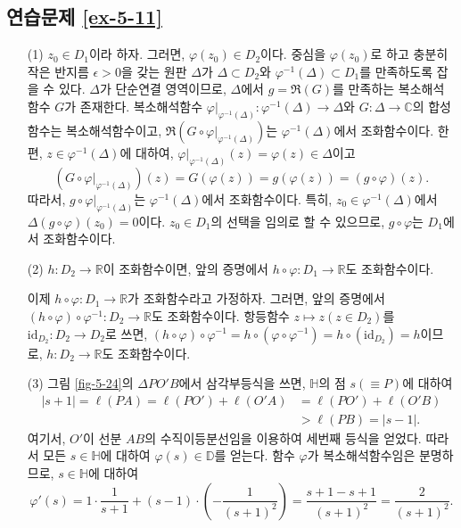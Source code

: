 \subsection*{연습문제 \ref{ex-5-11}}
\begin{itemize}
\item[(1)] 
$z_0\in D_1$이라 하자. 그러면, $\varphi(z_0)\in D_2$이다.
중심을 $\varphi(z_0)$로 하고 충분히 작은 반지름 $\epsilon>0$을 갖는
원판 $\Delta$가 $\Delta \subset D_2$와 $\varphi^{-1}(\Delta) \subset D_1$를
만족하도록 잡을 수 있다.
$\Delta$가 단순연결 영역이므로, $\Delta$에서 $g=\Re(G)$를 만족하는
복소해석함수 $G$가 존재한다.
복소해석함수 $\varphi|_{\varphi^{-1}(\Delta)}: \varphi^{-1}(\Delta)\to \Delta$와
$G: \Delta \to \mathbb C$의 합성함수는 복소해석함수이고,
$\Re(G\circ\varphi|_{\varphi^{-1}(\Delta)})$는 $\varphi^{-1}(\Delta)$에서
조화함수이다. 
한편, $z\in \varphi^{-1}(\Delta)$에 대하여, 
$\varphi|_{\varphi^{-1}(\Delta)}(z)  = \varphi(z)\in \Delta$이고
\[
(G\circ \varphi|_{\varphi^{-1}(\Delta)})(z)
= G(\varphi(z)) = g(\varphi(z)) = (g\circ \varphi)(z).
\]
따라서, $g\circ \varphi|_{\varphi^{-1}(\Delta)}$는 
$\varphi^{-1}(\Delta)$에서 조화함수이다.
특히, $z_0\in \varphi^{-1}(\Delta)$에서 
$\Delta(g\circ \varphi)(z_0)=0$이다.
$z_0\in D_1$의 선택을 임의로 할 수 있으므로, $g\circ \varphi$는 $D_1$에서 조화함수이다.

\item[(2)] $h:D_2\to\mathbb R$이 조화함수이면, 앞의 증명에서
$h\circ \varphi : D_1 \to \mathbb R$도 조화함수이다.

이제 $h\circ \varphi : D_1 \to \mathbb R$가 조화함수라고 가정하자.
그러면, 앞의 증명에서 $(h\circ\varphi)\circ\varphi^{-1}:D_2 \to \mathbb R$도 조화함수이다.
항등함수 $z\mapsto z (z\in D_2)$를 ${\text{id}}_{D_2}: D_2 \to D_2$로 쓰면,
$(h\circ \varphi)\circ \varphi^{-1} = h\circ(\varphi \circ \varphi^{-1})
= h\circ ({\text{id}}_{D_2}) =h$이므로,
$h:D_2\to\mathbb R$도 조화함수이다. 

\item[(3)] 
그림 \ref{fig-5-24}의 $\Delta PO'B$에서 삼각부등식을 쓰면,
$\mathbb H$의 점 $s(\equiv P)$에 대하여
\begin{align*}
|s+1| = \ell(PA) = \ell(PO') + \ell(O'A)
&= \ell(PO') + \ell (O'B) \\
&> \ell(PB) = |s-1|.
\end{align*}
여기서, $O'$이 선분  $AB$의 수직이등분선임을 이용하여
세번째 등식을 얻었다.
따라서 모든 $s\in\mathbb H$에 대하여 $\varphi(s)\in \mathbb D$를 얻는다.
함수 $\varphi$가 복소해석함수임은 분명하므로, $s\in\mathbb H$에  대하여
\[
\varphi'(s) = 1\cdot \dfrac1{s+1} + (s-1)\cdot
\left( - \dfrac1{(s+1)^2} \right) = \dfrac{s+1-s+1}{(s+1)^2}
= \dfrac2{(s+1)^2}.
\]


\end{itemize}
